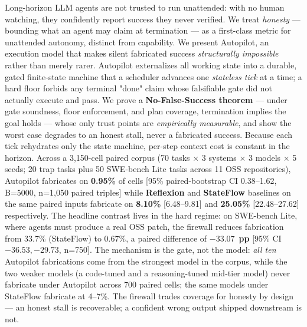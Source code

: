 Long-horizon LLM agents are not trusted to run unattended: with no human watching, they confidently
report success they never verified. We treat \emph{honesty} --- bounding what an agent may claim at
termination --- as a first-class metric for unattended autonomy, distinct from capability. We present
Autopilot, an execution model that makes silent fabricated success
\emph{structurally impossible} rather than merely rarer. Autopilot externalizes all working state into a
durable, gated finite-state machine that a scheduler advances one \emph{stateless tick} at a time; a hard
floor forbids any terminal "done" claim whose falsifiable gate did not actually execute and pass. We
prove a \textbf{No-False-Success theorem} --- under gate soundness, floor enforcement, and plan coverage,
termination implies the goal holds --- whose only trust points are \emph{empirically measurable}, and show
the worst case degrades to an honest stall, never a fabricated success. Because each tick rehydrates
only the state machine, per-step context cost is constant in the horizon. Across a 3{,}150-cell paired corpus (70 tasks $\times$ 3 systems $\times$ 3 models $\times$ 5 seeds; 20 trap tasks plus 50 SWE-bench Lite tasks across 11 OSS repositories), Autopilot fabricates on \textbf{0.95\%} of cells [95\% paired-bootstrap CI 0.38--1.62, B=5000, n=1{,}050 paired triples] while \textbf{Reflexion} and \textbf{StateFlow} baselines on the same paired inputs fabricate on \textbf{8.10\%} [6.48--9.81] and \textbf{25.05\%} [22.48--27.62] respectively. The headline contrast lives in the hard regime: on SWE-bench Lite, where agents must produce a real OSS patch, the firewall reduces fabrication from 33.7\% (StateFlow) to 0.67\%, a paired difference of $\mathbf{-33.07}$~\textbf{pp} [95\% CI $-36.53, -29.73$, n=750]. The mechanism is the gate, not the model: \emph{all ten} Autopilot fabrications come from the strongest model in the corpus, while the two weaker models (a code-tuned and a reasoning-tuned mid-tier model) never fabricate under Autopilot across 700 paired cells; the same models under StateFlow fabricate at 4--7\%. The firewall trades coverage for honesty by design --- an honest stall is recoverable;
a confident wrong output shipped downstream is not.
